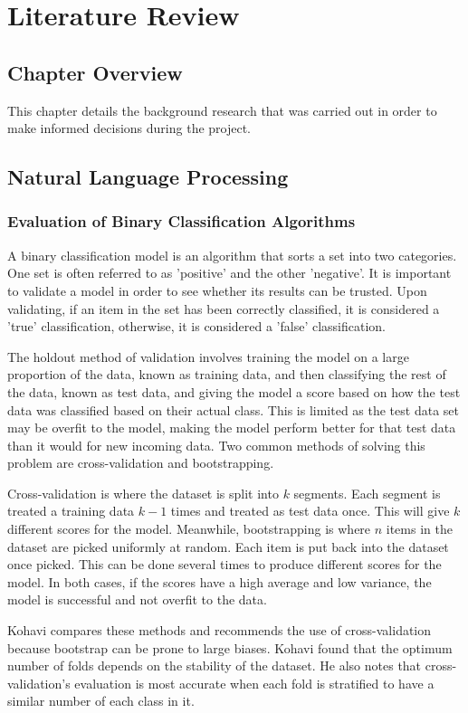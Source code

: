 \chapter{Literature Review}
	\section{Chapter Overview}
		This chapter details the background research that was carried out in order to make informed decisions during the project. 
	\section{Natural Language Processing}
		\subsection{Evaluation of Binary Classification Algorithms}
			A binary classification model is an algorithm that sorts a set into two categories. One set is often referred to as 'positive' and the other 'negative'. It is important to validate a model in order to see whether its results can be trusted. Upon validating, if an item in the set has been correctly classified, it is considered a 'true' classification, otherwise, it is considered a 'false' classification. 

			The holdout method of validation involves training the model on a large proportion of the data, known as training data, and then classifying the rest of the data, known as test data, and giving the model a score based on how the test data was classified based on their actual class. This is limited as the test data set may be overfit to the model, making the model perform better for that test data than it would for new incoming data. Two common methods of solving this problem are cross-validation and bootstrapping.  

			Cross-validation is where the dataset is split into $k$ segments. Each segment is treated a training data $k-1$ times and treated as test data once. This will give $k$ different scores for the model. Meanwhile, bootstrapping is where $n$ items in the dataset are picked uniformly at random. Each item is put back into the dataset once picked. This can be done several times to produce different scores for the model. In both cases, if the scores have a high average and low variance, the model is successful and not overfit to the data. 

			Kohavi compares these methods and recommends the use of cross-validation because bootstrap can be prone to large biases\cite{cv_bootstrap_kohavi}. Kohavi found that the optimum number of folds depends on the stability of the dataset. He also notes that cross-validation's evaluation is most accurate when each fold is stratified to have a similar number of each class in it. 


